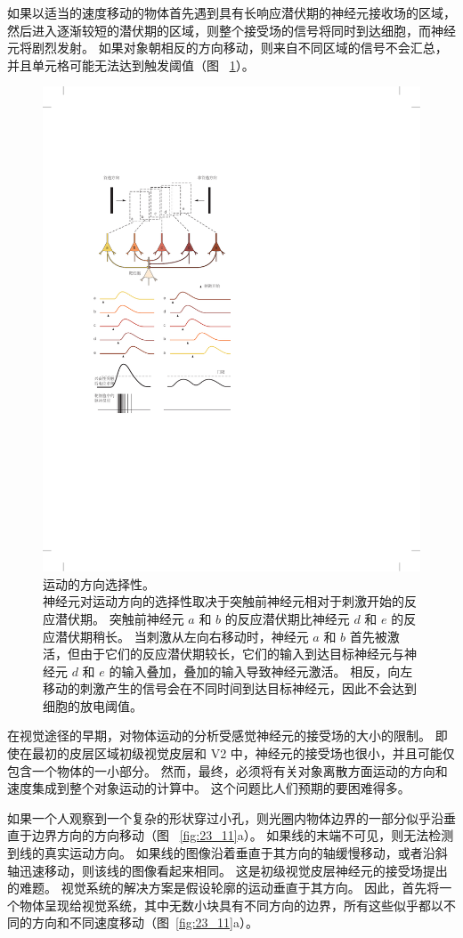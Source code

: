 如果以适当的速度移动的物体首先遇到具有长响应潜伏期的神经元接收场的区域，然后进入逐渐较短的潜伏期的区域，则整个接受场的信号将同时到达细胞，而神经元将剧烈发射。
如果对象朝相反的方向移动，则来自不同区域的信号不会汇总，并且单元格可能无法达到触发阈值（图 ~\ref{fig:23_10}）。


\begin{figure}[htbp]
	\centering
	\includegraphics[width=0.5\linewidth]{chap23/fig_23_10}
	\caption{运动的方向选择性。 \protect\\
		神经元对运动方向的选择性取决于突触前神经元相对于刺激开始的反应潜伏期。
		突触前神经元 $a$ 和 $b$ 的反应潜伏期比神经元 $d$ 和 $e$ 的反应潜伏期稍长。
		当刺激从左向右移动时，神经元 $a$ 和 $b$ 首先被激活，但由于它们的反应潜伏期较长，它们的输入到达目标神经元与神经元 $d$ 和 $e$ 的输入叠加，叠加的输入导致神经元激活。
		相反，向左移动的刺激产生的信号会在不同时间到达目标神经元，因此不会达到细胞的放电阈值\cite{priebe2008inhibition}。}
	\label{fig:23_10}
\end{figure}


在视觉途径的早期，对物体运动的分析受感觉神经元的接受场的大小的限制。 
即使在最初的皮层区域初级视觉皮层和 V2 中，神经元的接受场也很小，并且可能仅包含一个物体的一小部分。 
然而，最终，必须将有关对象离散方面运动的方向和速度集成到整个对象运动的计算中。 
这个问题比人们预期的要困难得多。


如果一个人观察到一个复杂的形状穿过小孔，则光圈内物体边界的一部分似乎沿垂直于边界方向的方向移动（图 ~\ref{fig:23_11}a）。 
如果线的末端不可见，则无法检测到线的真实运动方向。 
如果线的图像沿着垂直于其方向的轴缓慢移动，或者沿斜轴迅速移动，则该线的图像看起来相同。
这是初级视觉皮层神经元的接受场提出的难题。 
视觉系统的解决方案是假设轮廓的运动垂直于其方向。 
因此，首先将一个物体呈现给视觉系统，其中无数小块具有不同方向的边界，所有这些似乎都以不同的方向和不同速度移动（图~\ref{fig:23_11}a）。


